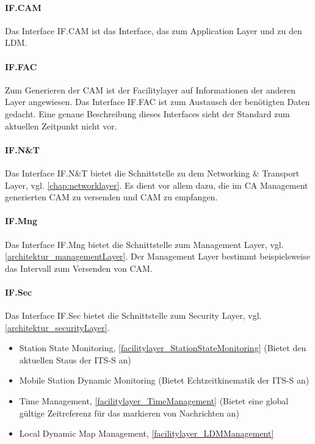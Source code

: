 \paragraph{IF.CAM}
Das Interface IF.CAM ist das Interface, das zum Application Layer und zu den \ac{LDM}. 

\paragraph{IF.FAC}
Zum Generieren der \ac{CAM} ist der Facilitylayer auf Informationen der anderen Layer angewiesen. Das Interface IF.FAC ist zum Austausch der benötigten Daten gedacht. Eine genaue Beschreibung dieses Interfaces sieht der Standard \cite{en302637-2} zum aktuellen Zeitpunkt nicht vor. 

\paragraph{IF.N\&T}
Das Interface IF.N\&T bietet die Schnittstelle zu dem Networking \& Transport Layer, vgl. \autoref{chap:networklayer}. Es dient vor allem dazu, die im \ac{CA} Management generierten \ac{CAM} zu versenden und \ac{CAM} zu empfangen. 

\paragraph{IF.Mng}
Das Interface IF.Mng bietet die Schnittstelle zum Management Layer, vgl. \ref{architektur_managementLayer}. Der Management Layer bestimmt beispielsweise das Intervall zum Versenden von \ac{CAM}.

\paragraph{IF.Sec}
Das Interface IF.Sec bietet die Schnittstelle zum Security Layer, vgl. \ref{architektur_securityLayer}.


\iffalse
\begin{itemize}
	\item Station State Monitoring, \autoref{facilitylayer_StationStateMonitoring} (Bietet den aktuellen Staus der \ac{ITS-S} an)
	\item Mobile Station Dynamic Monitoring (Bietet Echtzeitkinematik der \ac{ITS-S} an)
	\item Time Management, \autoref{facilitylayer_TimeManagement} (Bietet eine global gültige Zeitreferenz für das markieren von Nachrichten an)
	\item Local Dynamic Map Management, \autoref{facilitylayer_LDMManagement}
\end{itemize}

